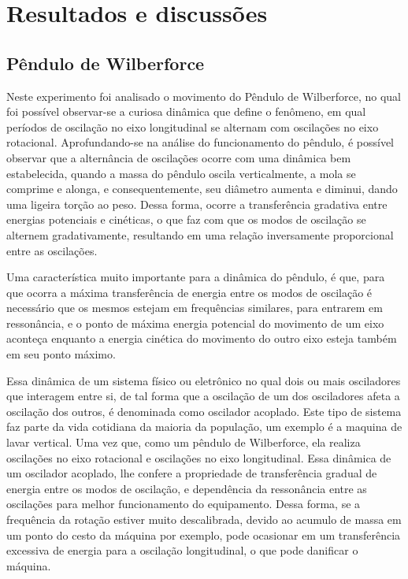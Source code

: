 \section{Resultados e discussões}
\subsection{Pêndulo de Wilberforce}
Neste experimento foi analisado o movimento do Pêndulo de Wilberforce, no qual foi possível observar-se a curiosa dinâmica que define o fenômeno,
em qual períodos de oscilação no eixo longitudinal se alternam com oscilações no eixo rotacional. Aprofundando-se na análise 
do funcionamento do pêndulo, é possível observar que a alternância de oscilações ocorre com uma dinâmica bem estabelecida, 
quando a massa do pêndulo oscila verticalmente, a mola se comprime e alonga, e consequentemente, seu diâmetro aumenta e diminui,
dando uma ligeira torção ao peso. Dessa forma, ocorre a transferência gradativa entre energias potenciais e cinéticas, o que
faz com que os modos de oscilação se alternem gradativamente, resultando em uma relação inversamente proporcional entre as oscilações.

Uma característica muito importante para a dinâmica do pêndulo, é que, para que ocorra a máxima transferência de energia entre os modos
de oscilação é necessário que os mesmos estejam em frequências similares, para entrarem em ressonância, e o ponto de máxima energia potencial
do movimento de um eixo aconteça enquanto a energia cinética do movimento do outro eixo esteja também em seu ponto máximo.

Essa dinâmica de um sistema físico ou eletrônico no qual dois ou mais osciladores que interagem entre si, de tal forma que a oscilação de 
um dos osciladores afeta a oscilação dos outros, é denominada como oscilador acoplado. Este tipo de sistema faz parte da vida cotidiana da maioria da 
população, um exemplo é a maquina de lavar vertical. Uma vez que, como um pêndulo de Wilberforce, ela realiza oscilações no 
eixo rotacional e oscilações no eixo longitudinal. Essa dinâmica de um oscilador acoplado, lhe confere a propriedade de transferência 
gradual de energia entre os modos de oscilação, e dependência da ressonância entre as oscilações para melhor funcionamento do equipamento.
Dessa forma, se a frequência da rotação estiver muito descalibrada, devido ao acumulo de massa em um ponto do cesto da máquina por exemplo,
pode ocasionar em um transferência excessiva de energia para a oscilação longitudinal, o que pode danificar o máquina.

